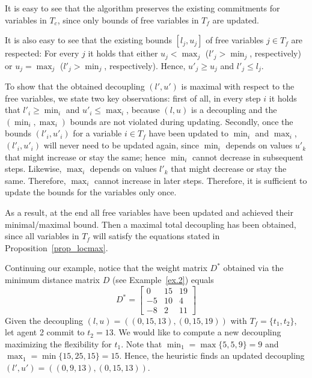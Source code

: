 It is easy to see that the algorithm preserves the existing commitments for variables in $T_c$, since only bounds of free variables in $T_f$ are updated. 

It is also easy to see that the existing bounds $[l_j, u_j]$ of  free variables $j \in T_f$ are respected:
For every $j$ it holds that either $u_j < \max_j$ ($ l'_j > \min_j$, respectively) or $u_j = \max_j$ ($ l'_j > \min_j$, respectively). Hence, $u'_j \geq u_j$ and $l'_j \leq l_j$.

To show that the obtained decoupling $(l', u')$ is maximal with respect to the free variables, we state two key observations: first of all, in every step $i$ it holds that $l'_i \geq \min_i$ and $u'_i \leq \max_i$, because $(l,u)$ is a decoupling and the $(\min_i, \max_i)$ bounds are not violated during updating. 
Secondly, once the bounds $(l'_i, u'_i)$ for a variable $i \in T_f$ have been updated to $\min_i$ and $\max_i$, $(l'_i, u'_i)$ will never need to be updated again, since
$\min_i$ depends on values $u'_k$ that might increase or stay the same; hence $\min_i$ cannot decrease in subsequent steps. Likewise, $\max_i$ depends on values $l'_k$ that might decrease or stay the same.
Therefore, $\max_i$ cannot increase in later steps.
Therefore, it is sufficient to update the bounds for the variables only once.

As a result, at the end all free variables have been updated and achieved their minimal/maximal bound. 
Then a maximal total decoupling has been obtained, since all variables in $T_f$ will satisfy the equations stated in Proposition~\ref{prop_locmax}. 
\begin{example}
Continuing our example, notice that the weight matrix $D^*$ obtained via the minimum distance matrix $D$ (see Example~\ref{ex.2}) equals
\begin{equation*}
D^* = \left[\begin{array}{ccc}
                  0 & 15 & 19  \\
                  -5 & 10 & 4  \\
                  -8 & 2  & 11
\end{array}  \right]
\end{equation*}
Given the decoupling $(l,u) = ( (0, 15 ,13), (0, 15, 19))$ with $T_f = \{t_1, t_2\}$, let agent 2 commit to $t_2=13$.
We would like to compute a new decoupling maximizing the flexibility for $t_1$. Note that $\min_1 = \max\{ 5, 5, 9\} = 9$ and $\max_1 =
\min\{15, 25, 15 \} = 15$. Hence, the heuristic finds an updated decoupling  $(l',u') = ( (0, 9 ,13), (0, 15, 13))$.
\end{example}
